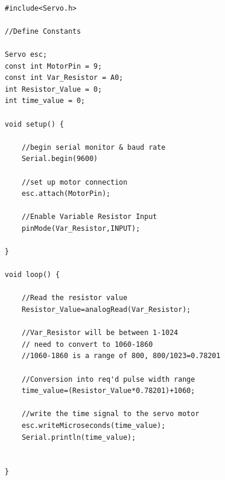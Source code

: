 \begin{lstlisting}

#include<Servo.h>

//Define Constants

Servo esc;
const int MotorPin = 9;
const int Var_Resistor = A0;
int Resistor_Value = 0;
int time_value = 0;

void setup() {
	
	//begin serial monitor & baud rate
	Serial.begin(9600)
	
	//set up motor connection
	esc.attach(MotorPin);  
	
	//Enable Variable Resistor Input
	pinMode(Var_Resistor,INPUT); 
	
}

void loop() {
	
	//Read the resistor value 
	Resistor_Value=analogRead(Var_Resistor);
	
	//Var_Resistor will be between 1-1024
	// need to convert to 1060-1860
	//1060-1860 is a range of 800, 800/1023=0.78201
	
	//Conversion into req'd pulse width range
	time_value=(Resistor_Value*0.78201)+1060;
	
	//write the time signal to the servo motor
	esc.writeMicroseconds(time_value);
	Serial.println(time_value);
	
	
}

\end{lstlisting}
